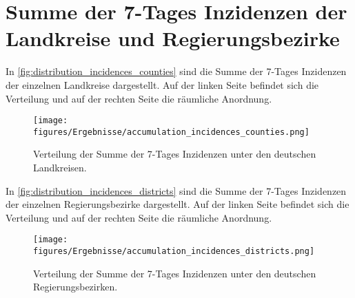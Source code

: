 \section{Summe der 7-Tages Inzidenzen der Landkreise und Regierungsbezirke}
In \autoref{fig:distribution_incidences_counties} sind die Summe der 7-Tages Inzidenzen der einzelnen Landkreise dargestellt. Auf der linken Seite befindet sich die Verteilung und auf der rechten Seite die räumliche Anordnung.

\begin{figure}[H]
    \centering
    \texttt{[image: figures/Ergebnisse/accumulation\_incidences\_counties.png]}
    \caption{Verteilung der Summe der 7-Tages Inzidenzen unter den deutschen Landkreisen.}
    \label{fig:distribution_incidences_counties}
\end{figure}

In \autoref{fig:distribution_incidences_districts} sind die Summe der 7-Tages Inzidenzen der einzelnen Regierungsbezirke dargestellt. Auf der linken Seite befindet sich die Verteilung und auf der rechten Seite die räumliche Anordnung.

\begin{figure}[H]
    \centering
    \texttt{[image: figures/Ergebnisse/accumulation\_incidences\_districts.png]}
    \caption{Verteilung der Summe der 7-Tages Inzidenzen unter den deutschen Regierungsbezirken.}
    \label{fig:distribution_incidences_districts}
\end{figure}